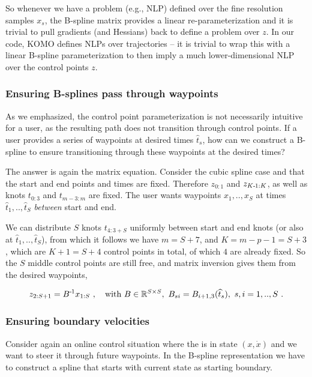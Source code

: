 So whenever we have a problem (e.g., NLP) defined over the fine resolution samples $x_s$, the B-spline matrix provides a linear re-parameterization and it is trivial to pull gradients (and Hessians) back to define a problem over $z$. In our code, KOMO defines NLPs over trajectories -- it is trivial to wrap this with a linear B-spline parameterization to then imply a much lower-dimensional NLP over the control points $z$.

\subsubsection{Ensuring B-splines pass through waypoints}

As we emphasized, the control point parameterization is not necessarily intuitive for a user, as the resulting path does not transition through control points. If a user provides a series of waypoints at desired times $\hat t_s$, how can we construct a B-spline to ensure transitioning through these waypoints at the desired times?

The answer is again the matrix equation. Consider the cubic spline case and that the start and end points and times are fixed. Therefore $z_{0:1}$ and $z_{K{{\hspace*{-.0pt}\text{\rm -}\hspace*{-.5pt}}1}:K}$, as well as knots $t_{0:3}$ and $t_{m-3:m}$ are fixed. The user wants waypoints $x_1,..,x_S$ at times $\hat t_1,..,\hat t_S$ \emph{between} start and end.

We can distribute $S$ knots $t_{4:3+S}$ uniformly between start and end knots (or also at $\hat t_1,..,\hat t_S$), from which it follows we have $m = S+7$, and $K=m-p-1=S+3$, which are $K+1=S+4$ control points in total, of which $4$ are already fixed. So the $S$ middle control points are still free, and matrix inversion gives them from the desired waypoints,

$$\begin{align}
  z_{2:S+1} = B^{{\hspace*{-.0pt}\text{\rm -}\hspace*{-.5pt}}1} x_{1:S} ~,\quad \text{with } B \in {\mathbb{R}}^{S \times S},~ B_{si} =  B_{i+1,3}(\widehat t_s),~ s,i=1,..,S  ~.
  \end{align}$$



\subsubsection{Ensuring boundary velocities}

Consider again an online control situation where the is in state $(x,\dot x)$ and we want to steer it through future waypoints. In the B-spline representation we have to construct a spline that starts with current state as starting boundary.

